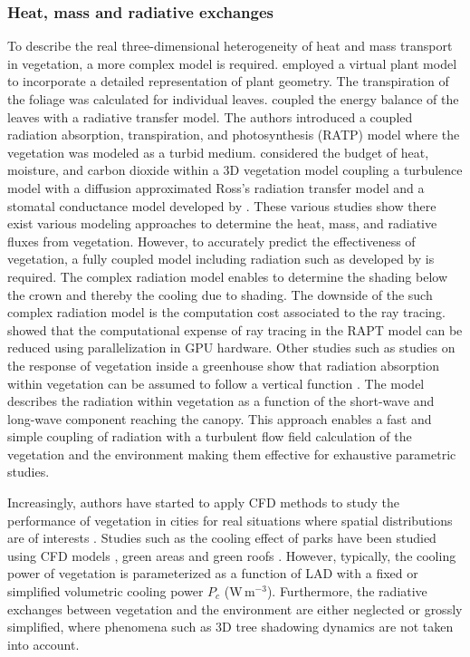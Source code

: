 \subsubsection*{Heat, mass and radiative exchanges}


To describe the real three-dimensional heterogeneity of heat and mass transport in vegetation, a more complex model is required. \cite{Dauzat2001} employed a virtual plant model to incorporate a detailed representation of plant geometry. The transpiration of the foliage was calculated for individual leaves. \cite{Sinoquet2001} coupled the energy balance of the leaves with a radiative transfer model. The authors introduced a coupled radiation absorption, transpiration, and photosynthesis (RATP) model where the vegetation was modeled as a turbid medium. \cite{Hiraoka2005} considered the budget of heat, moisture, and carbon dioxide within a 3D vegetation model coupling a turbulence model with a diffusion approximated Ross’s radiation transfer model and a stomatal conductance model developed by \cite{Colla}. These various studies show there exist various modeling approaches to determine the heat, mass, and radiative fluxes from vegetation. However, to accurately predict the effectiveness of vegetation, a fully coupled model including radiation such as developed by \cite{Hiraoka2005} is required. The complex radiation model enables to determine the shading below the crown and thereby the cooling due to shading. The downside of the such complex radiation model is the computation cost associated to the ray tracing. \cite{Bailey2014} showed that the computational expense of ray tracing in the RAPT model can be reduced using parallelization in GPU hardware. Other studies such as studies on the response of vegetation inside a greenhouse show that radiation absorption within vegetation can be assumed to follow a vertical function \citep{Majdoubi2009,Kichah2012}. The model describes the radiation within vegetation as a function of the short-wave and long-wave component reaching the canopy. This approach enables a fast and simple coupling of radiation with a turbulent flow field calculation of the vegetation and the environment making them effective for exhaustive parametric studies. 
	
Increasingly, authors have started to apply CFD methods to study the performance of vegetation in cities for real situations where spatial distributions are of interests \citep{Gromke2014,Yoshida2006,Buccolieri2018}. Studies such as the cooling effect of parks have been studied using CFD models \citep{Toparlar2017a}, green areas \citep{Honjo1990,Ng2012} and green roofs \citep{Alexandri2008}. However, typically, the cooling power of vegetation is parameterized as a function of LAD with a fixed or simplified volumetric cooling power $P_c$ (W\,m$^{-3}$). Furthermore, the radiative exchanges between vegetation and the environment are either neglected or grossly simplified, where phenomena such as 3D tree shadowing dynamics are not taken into account.


